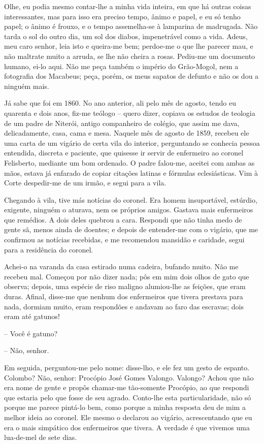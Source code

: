 Olhe, eu podia mesmo contar-lhe a minha vida inteira, em que há outras
coisas interessantes, mas para isso era preciso tempo, ânimo e papel, e
eu só tenho papel; o ânimo é frouxo, e o tempo assemelha-se à lamparina
de madrugada. Não tarda o sol do outro dia, um sol dos diabos,
impenetrável como a vida. Adeus, meu caro senhor, leia isto e queira-me
bem; perdoe-me o que lhe parecer mau, e não maltrate muito a arruda, se
lhe não cheira a rosas. Pediu-me um documento humano, ei-lo aqui. Não me
peça também o império do Grão-Mogol, nem a fotografia dos Macabeus;
peça, porém, os meus sapatos de defunto e não os dou a ninguém mais.

Já sabe que foi em 1860. No ano anterior, ali pelo mês de agosto, tendo
eu quarenta e dois anos, fiz-me teólogo -- quero dizer, copiava os
estudos de teologia de um padre de Niterói, antigo companheiro de
colégio, que assim me dava, delicadamente, casa, cama e mesa. Naquele
mês de agosto de 1859, recebeu ele uma carta de um vigário de certa vila
do interior, perguntando se conhecia pessoa entendida, discreta e
paciente, que quisesse ir servir de enfermeiro ao coronel Felisberto,
mediante um bom ordenado. O padre falou-me, aceitei com ambas as mãos,
estava já enfarado de copiar citações latinas e fórmulas eclesiásticas.
Vim à Corte despedir-me de um irmão, e segui para a vila.

Chegando à vila, tive más notícias do coronel. Era homem insuportável,
estúrdio, exigente, ninguém o aturava, nem os próprios amigos. Gastava
mais enfermeiros que remédios. A dois deles quebrou a cara. Respondi que
não tinha medo de gente sã, menos ainda de doentes; e depois de
entender-me com o vigário, que me confirmou as notícias recebidas, e me
recomendou mansidão e caridade, segui para a residência do coronel.

Achei-o na varanda da casa estirado numa cadeira, bufando muito. Não me
recebeu mal. Começou por não dizer nada; pôs em mim dois olhos de gato
que observa; depois, uma espécie de riso maligno alumiou-lhe as feições,
que eram duras. Afinal, disse-me que nenhum dos enfermeiros que tivera
prestava para nada, dormiam muito, eram respondões e andavam ao faro das
escravas; dois eram até gatunos!

-- Você é gatuno?

-- Não, senhor.

Em seguida, perguntou-me pelo nome: disse-lho, e ele fez um gesto de
espanto. Colombo? Não, senhor: Procópio José Gomes Valongo. Valongo?
Achou que não era nome de gente e propôs chamar-me tão-somente Procópio,
ao que respondi que estaria pelo que fosse de seu agrado. Conto-lhe esta
particularidade, não só porque me parece pintá-lo bem, como porque a
minha resposta deu de mim a melhor ideia ao coronel. Ele mesmo o
declarou ao vigário, acrescentando que eu era o mais simpático dos
enfermeiros que tivera. A verdade é que vivemos uma lua-de-mel de sete
dias.

